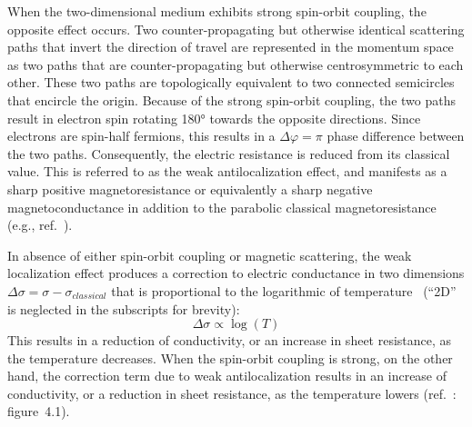 When the two-dimensional medium exhibits strong spin-orbit coupling, the opposite effect occurs. Two counter-propagating but otherwise identical scattering paths that invert the direction of travel are represented in the momentum space as two paths that are counter-propagating but otherwise centrosymmetric to each other. These two paths are topologically equivalent to two connected semicircles that encircle the origin. Because of the strong spin-orbit coupling, the two paths result in electron spin rotating \ang{180} towards the opposite directions. Since electrons are spin-half fermions, this results in a $\Delta\varphi=\pi$ phase difference between the two paths. Consequently, the electric resistance is reduced from its classical value. This is referred to as the weak antilocalization effect, and manifests as a sharp positive magnetoresistance or equivalently a sharp negative magnetoconductance in addition to the parabolic classical magnetoresistance (e.g., ref.~\cite{TI_WAL_Hongkong}).

In absence of either spin-orbit coupling or magnetic scattering, the weak localization effect produces a correction to electric conductance in two dimensions $\Delta\sigma = \sigma - \sigma_{classical}$ that is proportional to the logarithmic of temperature~\cite{anderson1979, dolan1979} (``2D'' is neglected in the subscripts for brevity):%
\begin{equation}\label{eq:wl_T}
    \Delta\sigma \propto \log(T)
\end{equation}%
This results in a reduction of conductivity, or an increase in sheet resistance, as the temperature decreases. When the spin-orbit coupling is strong, on the other hand, the correction term due to weak antilocalization results in an increase of conductivity, or a reduction in sheet resistance, as the temperature lowers (ref.~\cite{bergmann1984}: figure~4.1).

